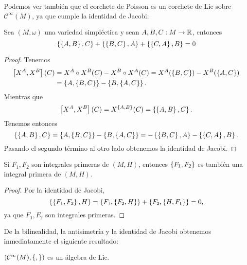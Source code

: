 Podemos ver también que el corchete de Poisson es un corchete de Lie sobre $\mathcal{C}^{\infty}(M)$, ya que cumple la identidad de Jacobi:
\begin{prop}
 Sea $(M,\omega)$ una variedad simpléctica y sean  $A,B,C:M \rightarrow \mathbb{R}$, entonces
 \begin{equation*}
   \left\lbrace\left\lbrace A,B\right\rbrace,C\right\rbrace+ \left\lbrace\left\lbrace B,C\right\rbrace,A\right\rbrace + \left\lbrace\left\lbrace C,A\right\rbrace,B\right\rbrace=0
 \end{equation*}
 \begin{proof}
   Tenemos 
   \begin{align*}
     \left[X^A,X^B\right] (C) & = X^A\circ X^B (C) - X^B\circ X^A (C)  = X^A(\left\lbrace B,C\right\rbrace)-X^B(\left\lbrace A,C\right\rbrace) \\
     &= \left\lbrace A,\left\lbrace B,C\right\rbrace\right\rbrace-\left\lbrace B,\left\lbrace A,C\right\rbrace\right\rbrace.
   \end{align*}
   Mientras que
   \begin{equation*}
     \left[X^A,X^B\right](C)=X^{\left\lbrace A,B\right\rbrace}(C)=\left\lbrace\left\lbrace A,B\right\rbrace,C\right\rbrace.
   \end{equation*}
   Tenemos entonces
   \begin{equation*}
     \left\lbrace\left\lbrace A,B\right\rbrace,C\right\rbrace=\left\lbrace A,\left\lbrace B,C\right\rbrace\right\rbrace-\left\lbrace B,\left\lbrace A,C\right\rbrace\right\rbrace=-\left\lbrace\left\lbrace B,C\right\rbrace,A\right\rbrace-\left\lbrace\left\lbrace C,A\right\rbrace,B\right\rbrace.
   \end{equation*}
   Pasando el segundo término al otro lado obtenemos la identidad de Jacobi.
 \end{proof}
\end{prop}
\begin{corol}
  Si $F_1, F_2$ son integrales primeras de $(M,H)$, entonces $\left\lbrace F_1,F_2\right\rbrace$ es también una integral primera de $(M,H)$.
\end{corol}
\begin{proof}
  Por la identidad de Jacobi,
  \begin{equation*}
    \left\lbrace \left\lbrace F_1,F_2\right\rbrace, H\right\rbrace= \left\lbrace F_1, \left\lbrace F_2,H\right\rbrace\right\rbrace + \left\lbrace F_2, \left\lbrace H,F_1\right\rbrace \right\rbrace=0,
  \end{equation*}
  ya que $F_1,F_2$ son integrales primeras.
\end{proof}

De la bilinealidad, la antisimetría y la identidad de Jacobi obtenemos inmediatamente el siguiente resultado:
\begin{corol}
  $(\mathcal{C}^{\infty}(M),\left\lbrace , \right\rbrace)$ es un álgebra de Lie.  
\end{corol}

